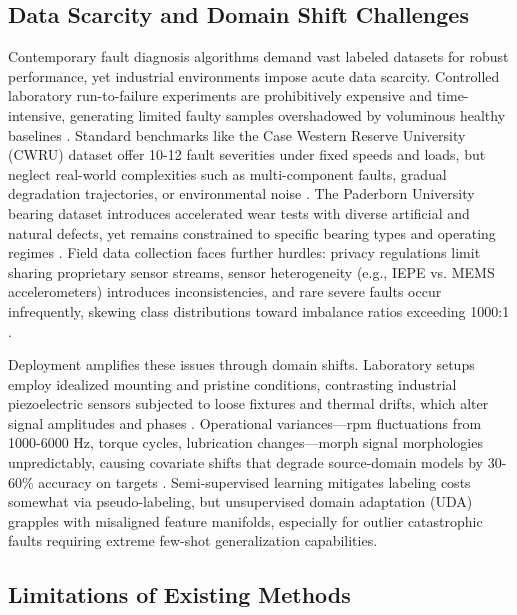 \subsection{Data Scarcity and Domain Shift Challenges}

Contemporary fault diagnosis algorithms demand vast labeled datasets for robust performance, yet industrial environments impose acute data scarcity. Controlled laboratory run-to-failure experiments are prohibitively expensive and time-intensive, generating limited faulty samples overshadowed by voluminous healthy baselines \cite{cite5}. Standard benchmarks like the Case Western Reserve University (CWRU) dataset offer 10-12 fault severities under fixed speeds and loads, but neglect real-world complexities such as multi-component faults, gradual degradation trajectories, or environmental noise \cite{cite6}. The Paderborn University bearing dataset introduces accelerated wear tests with diverse artificial and natural defects, yet remains constrained to specific bearing types and operating regimes \cite{cite7}. Field data collection faces further hurdles: privacy regulations limit sharing proprietary sensor streams, sensor heterogeneity (e.g., IEPE vs. MEMS accelerometers) introduces inconsistencies, and rare severe faults occur infrequently, skewing class distributions toward imbalance ratios exceeding 1000:1 \cite{cite8}.

Deployment amplifies these issues through domain shifts. Laboratory setups employ idealized mounting and pristine conditions, contrasting industrial piezoelectric sensors subjected to loose fixtures and thermal drifts, which alter signal amplitudes and phases \cite{cite25}. Operational variances—rpm fluctuations from 1000-6000 Hz, torque cycles, lubrication changes—morph signal morphologies unpredictably, causing covariate shifts that degrade source-domain models by 30-60\% accuracy on targets \cite{cite9}\cite{cite26}. Semi-supervised learning mitigates labeling costs somewhat via pseudo-labeling, but unsupervised domain adaptation (UDA) grapples with misaligned feature manifolds, especially for outlier catastrophic faults requiring extreme few-shot generalization capabilities.

\subsection{Limitations of Existing Methods}

